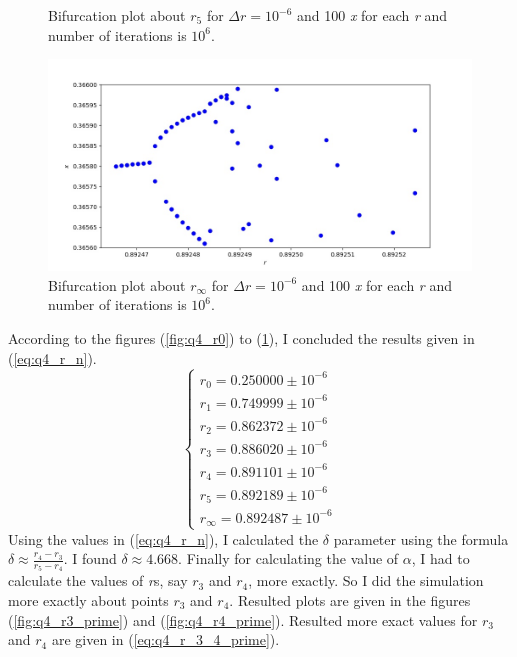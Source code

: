 \documentclass[12pt, a4paper]{article}
\begin{document}
\begin{figure}[h]
\begin{minipage}[b]{0.4\textwidth}
		\caption{Bifurcation plot about $r_5$ for $\Delta r=10^{-6}$ and 100 \textit{x} for each 
		\textit{r} and number of iterations is $10^6$.}
		\label{fig:q4_r5}
		\end{minipage}
		\hfill
		\begin{minipage}[b]{0.4\textwidth}
		\includegraphics[width=\textwidth]{../q4/q4_0.8924660000000001_0.892524_55_100_1000000.jpg}
		\caption{Bifurcation plot about $r_{\infty}$ for $\Delta r=10^{-6}$ and 100 \textit{x} for each 
		\textit{r} and number of iterations is $10^6$.}
		\label{fig:q4_r_infinity}
		\end{minipage}
		\hfill
	\end{figure}
	According to the figures (\ref{fig:q4_r0}) to (\ref{fig:q4_r_infinity}), I concluded the results given in (\ref{eq:q4_r_n}).
	\begin{equation}
		\begin{cases}
			r_0 = 0.250000 \pm 10^{-6} \\
			r_1 = 0.749999 \pm 10^{-6} \\
			r_2 = 0.862372 \pm 10^{-6} \\
			r_3 = 0.886020 \pm 10^{-6} \\
			r_4 = 0.891101 \pm 10^{-6} \\
			r_5 = 0.892189 \pm 10^{-6} \\
			r_\infty = 0.892487 \pm 10^{-6}
		\label{eq:q4_r_n}
		\end{cases}
	\end{equation}
	Using the values in (\ref{eq:q4_r_n}), I calculated the $\delta$ parameter using the 
	formula $\delta \approx \frac{r_4 - r_3}{r_5 - r_4}$. I found $\delta \approx 4.668.$
	Finally for calculating the value of $\alpha$, I had to calculate the values of \textit{r}s,
	say $r_3$ and $r_4$, more exactly. So I did the simulation more exactly about points $r_3$
	and $r_4$. Resulted plots are given in the figures (\ref{fig:q4_r3_prime}) and (\ref{fig:q4_r4_prime}). Resulted more exact values for $r_3$ and $r_4$ are given in (\ref{eq:q4_r_3_4_prime}).
\end{document}
